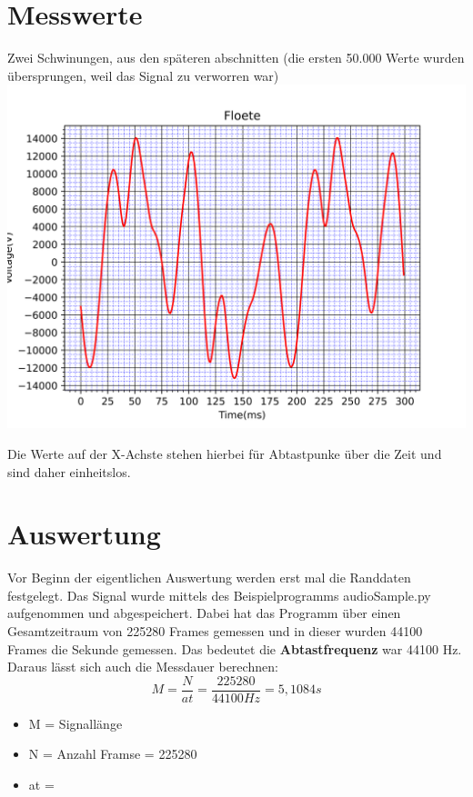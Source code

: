 \section{Messwerte}
\label{chap:VERSUCH_1_MESSWERTE}

Zwei Schwinungen, aus den späteren abschnitten (die ersten 50.000 Werte wurden übersprungen, weil das Signal zu verworren war)
\includegraphics[scale=0.05]{media/Signal_Raster.png}

Die Werte auf der X-Achste stehen hierbei für Abtastpunke über die Zeit und sind daher einheitslos.

\section{Auswertung}
\label{chap:VERSUCH_1_AUSWERTUNG}

Vor Beginn der eigentlichen Auswertung werden erst  mal die Randdaten festgelegt. Das Signal wurde mittels des Beispielprogramms audioSample.py aufgenommen und abgespeichert. Dabei hat das Programm über einen Gesamtzeitraum von 225280 Frames gemessen und in dieser wurden 44100 Frames die Sekunde gemessen.
Das bedeutet die \textbf{Abtastfrequenz} war 44100 Hz.
Daraus lässt sich auch die Messdauer berechnen:
\begin{equation}
	M = \frac{N}{at} = \frac{225280}{44100 Hz} = 5,1084 s
\end{equation}
\begin{itemize}
	\item M = Signallänge
	\item N = Anzahl Framse = 225280
	\item at = 
\end{itemize}

